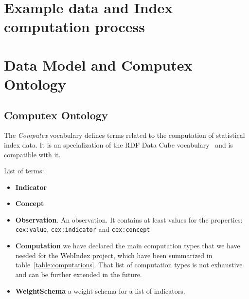 \section{Example data and Index computation process}


\section{Data Model and Computex Ontology}


\subsection{Computex Ontology}
The \emph{Computex} vocabulary 
defines terms related to the computation of statistical index data. 
It is an specialization of the RDF Data Cube vocabulary~\cite{Cube} and is 
 compatible with it.

List of terms:

\begin{itemize}
\item\textbf{Indicator}

\item\textbf{Concept}

\item\textbf{Observation}. An observation. 
 It contains at least values for the properties:
   \lstinline|cex:value|, 
   \lstinline|cex:indicator| and 
   \lstinline|cex:concept|

\item\textbf{Computation} we have declared the main computation types that we
have needed for the WebIndex project, which have been summarized in
table~\ref{table:computations}. That list of computation types is not exhaustive
and can be further extended in the future. 

\item\textbf{WeightSchema} a weight schema for a list of indicators.

\end{itemize}

